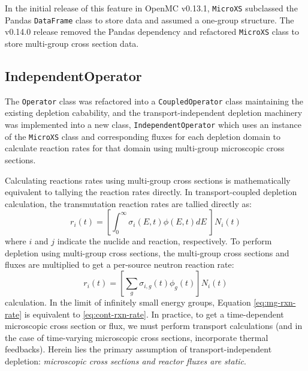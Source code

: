         In the initial release of this feature in OpenMC v0.13.1, \verb.MicroXS.
        subclassed the Pandas \verb.DataFrame. class to store data and assumed a
        one-group structure. The v0.14.0 release removed the Pandas dependency
        and refactored \verb.MicroXS. class to store multi-group cross section
        data.
         
    \subsection{IndependentOperator}
        The \verb.Operator. class was refactored into a \verb.CoupledOperator.
        class maintaining the existing depletion cabability, and the
        transport-independent depletion machinery was implemented into a new
        class, \verb.IndependentOperator. which uses an instance of the
        \verb.MicroXS. class and corresponding fluxes for each depletion domain
        to calculate reaction rates for that domain using multi-group microscopic
        cross sections.

        Calculating reactions rates using multi-group cross sections is
        mathematically equivalent to tallying the reaction rates directly. In
        transport-coupled depletion calculation, the transmutation reaction
        rates are tallied directly as:
        \begin{equation}
            \label{eq:cont-rxn-rate}
            r_{i}(t) = \left[\int_0^\infty \sigma_i(E,t) \phi(E,t) dE \; \right]
            N_{i}(t)
        \end{equation}
        where $i$ and $j$ indicate the nuclide and reaction, respectively.
            To perform depletion using multi-group cross sections, the multi-group
        cross sections and fluxes are multiplied to get a per-source neutron
        reaction rate:
        \begin{equation}
            \label{eq:mg-rxn-rate}
            r_{i}(t) = \left[\sum_{g} \sigma_{i,g}(t) \phi_{g}(t) \right]
            N_{i}(t) 
        \end{equation}
        calculation. In the limit of infinitely small energy groups, Equation
        \ref{eq:mg-rxn-rate} is equivalent to \ref{eq:cont-rxn-rate}. In
        practice, to get a time-dependent microscopic cross section or flux, we
        must perform transport calculations (and in the case of time-varying
        microscopic cross sections, incorporate thermal feedbacks). Herein lies
        the primary assumption of transport-independent depletion: {\it
        microscopic cross sections and reactor fluxes are static}.

